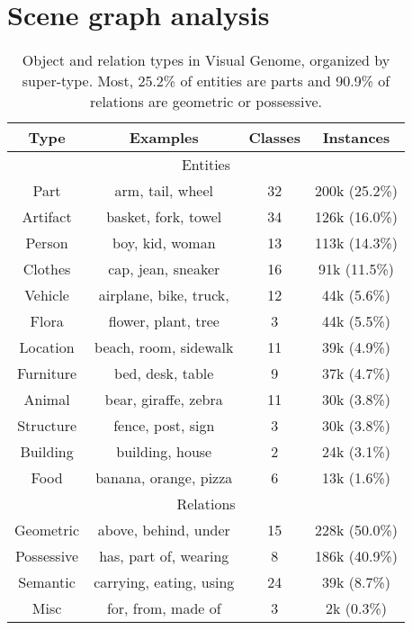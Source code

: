 \documentclass[10pt,twocolumn,letterpaper]{article}
\begin{document}
\section{Scene graph analysis}
\label{sec:analysis}
\begin{table}[t]
    \small
    \centering
    \begin{tabular}{@{}c c c c@{}}
        \toprule

        Type & Examples & Classes & Instances \\

        \midrule

        \multicolumn{4}{c}{Entities}\\

        \cmidrule{1-4}

         Part & arm, tail, wheel & 32 & 200k (25.2\%)\\
         Artifact & basket, fork, towel & 34 & 126k (16.0\%) \\
         Person & boy, kid, woman & 13 & 113k (14.3\%) \\
         Clothes & cap, jean, sneaker & 16 & 91k (11.5\%) \\
         Vehicle & airplane, bike, truck,  & 12 &  44k (5.6\%)\\
         Flora & flower, plant, tree & 3 & 44k (5.5\%)\\
         Location & beach, room, sidewalk & 11 & 39k (4.9\%) \\
         Furniture & bed, desk, table & 9  & 37k (4.7\%)\\
         Animal & bear, giraffe, zebra  & 11 & 30k (3.8\%) \\
         Structure & fence, post, sign & 3 & 30k (3.8\%)\\
         Building & building, house & 2 & 24k (3.1\%)\\
         Food & banana, orange, pizza & 6  & 13k (1.6\%) \\

        \cmidrule{1-4}

        \multicolumn{4}{c}{Relations}\\

        \cmidrule{1-4}

         Geometric & above, behind, under & 15 & 228k (50.0\%)\\
         Possessive & has, part of, wearing & 8 & 186k (40.9\%)\\
         Semantic & carrying, eating, using & 24 & 39k (8.7\%)\\
         Misc & for, from, made of & 3 & 2k (0.3\%) \\

         \bottomrule
    \end{tabular}
    \caption{Object and relation types in Visual Genome, organized by super-type. Most, 25.2\% of entities are parts and 90.9\% of relations are geometric or possessive.}
    \label{tab:data_stat}
\end{table}%
\end{document}
